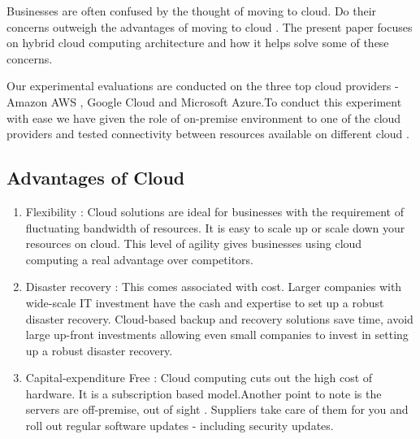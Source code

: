 \documentclass[journal]{hybrid-cloud}
\begin{document}
Businesses are often confused by the thought of moving to cloud. Do their concerns outweigh the advantages of moving to cloud \cite{cloudadv}. The present paper focuses on hybrid cloud computing architecture and how it helps solve some of these concerns.

Our experimental evaluations are conducted on the three top cloud providers - Amazon AWS , Google Cloud and Microsoft Azure.To conduct this experiment with ease we have given the role of on-premise environment to one of the cloud providers and tested connectivity between resources available on different cloud .


\subsection{Advantages of Cloud}  \cite{cloudbenefits}
\begin{enumerate}
	\item Flexibility : Cloud solutions are ideal for businesses with the requirement of fluctuating bandwidth of resources. It is easy to scale up or scale down your resources on cloud. This level of agility gives businesses using cloud computing a real advantage over competitors. 
	\item Disaster recovery : This comes associated with cost. Larger companies with wide-scale IT investment have the cash and expertise to set up a robust disaster recovery. Cloud-based backup and recovery solutions save time, avoid large up-front investments allowing even small companies to invest in setting up a robust disaster recovery.
	\item Capital-expenditure Free : Cloud computing cuts out the high cost of hardware. It is a subscription based model.Another point to note is the servers are off-premise, out of sight . Suppliers take care of them for you and roll out regular software updates - including security updates.
	
	
\end{enumerate}


\end{document}
